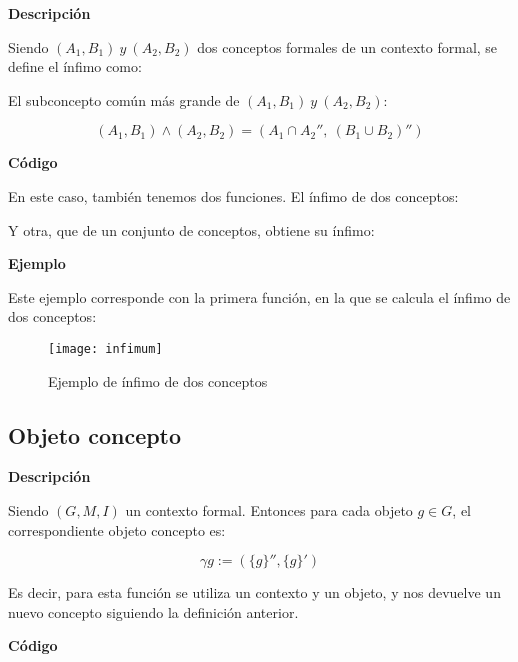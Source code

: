     
        \textbf{Descripci\'on}

        Siendo \((A_{1}, B_{1}) ~ y ~ (A_{2}, B_{2})\) dos conceptos formales de un contexto formal, se define el \'infimo como:

        El subconcepto com\'un m\'as grande de \((A_{1}, B_{1}) ~ y ~ (A_{2}, B_{2})\):

        \[ (A_{1}, B_{1}) \wedge (A_{2}, B_{2}) = (A_{1} \cap A_{2}'', ~ (B_{1}\cup B_{2})'') \]

        \clearpage

        \textbf{C\'odigo}

        En este caso, tambi\'en tenemos dos funciones. El \'infimo de dos conceptos:

        

        Y otra, que de un conjunto de conceptos, obtiene su \'infimo:

        

        \bigskip

        \textbf{Ejemplo}

        Este ejemplo corresponde con la primera funci\'on, en la que se calcula el \'infimo de dos conceptos:

        \begin{figure}[H]
            \centering
            \texttt{[image: infimum]}
            \caption{Ejemplo de \'infimo de dos conceptos}
            \label{fig:infimum}
        \end{figure}



    \subsection{Objeto concepto}

    
        \textbf{Descripci\'on}

        Siendo \( (G, M, I) \) un contexto formal. Entonces para cada objeto \( g \in G\), el correspondiente objeto concepto es:

        \[ \gamma g:=(\{g\}'', \{g\}') \]

        Es decir, para esta funci\'on se utiliza un contexto y un objeto, y nos devuelve un nuevo concepto siguiendo la definici\'on 
        anterior.
        \\

        \clearpage

        \textbf{C\'odigo}

